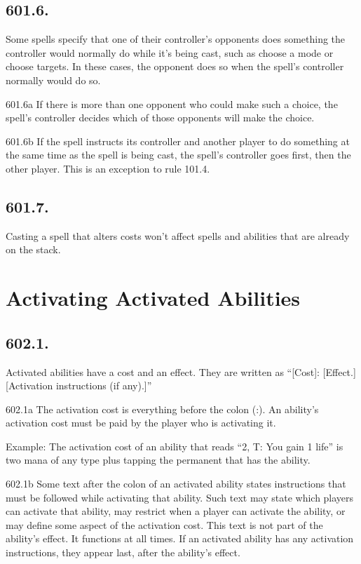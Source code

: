 \subsection*{601.6.}
Some spells specify that one of their controller’s opponents does something the controller would normally do while it’s being cast, such as choose a mode or choose targets. In these cases, the opponent does so when the spell’s controller normally would do so.

601.6a If there is more than one opponent who could make such a choice, the spell’s controller decides which of those opponents will make the choice.

601.6b If the spell instructs its controller and another player to do something at the same time as the spell is being cast, the spell’s controller goes first, then the other player. This is an exception to rule 101.4.

\subsection*{601.7.}
Casting a spell that alters costs won’t affect spells and abilities that are already on the stack.

\section{Activating Activated Abilities}
\subsection*{602.1.}
Activated abilities have a cost and an effect. They are written as “[Cost]: [Effect.] [Activation instructions (if any).]”

602.1a The activation cost is everything before the colon (:). An ability’s activation cost must be paid by the player who is activating it.

Example: The activation cost of an ability that reads “{2}, {T}: You gain 1 life” is two mana of any type plus tapping the permanent that has the ability.

602.1b Some text after the colon of an activated ability states instructions that must be followed while activating that ability. Such text may state which players can activate that ability, may restrict when a player can activate the ability, or may define some aspect of the activation cost. This text is not part of the ability’s effect. It functions at all times. If an activated ability has any activation instructions, they appear last, after the ability’s effect.

